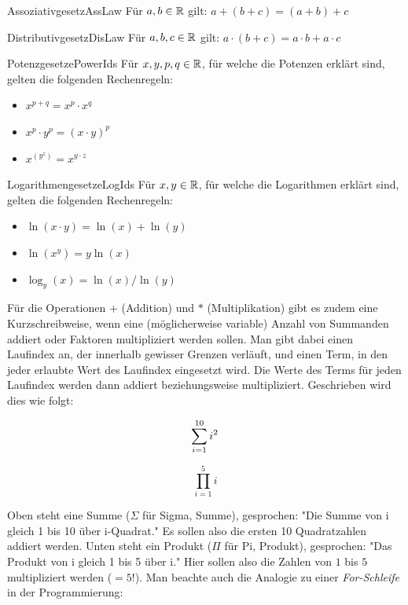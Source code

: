 \begin{statement}{Assoziativgesetz}{AssLaw}
	Für $a,b\in\mathbb{R}$ gilt: $a + ( b + c) = (a + b) + c$
\end{statement}

\begin{statement}{Distributivgesetz}{DisLaw}
	Für $a,b,c\in\mathbb{R}$ gilt: $a \cdot ( b + c ) = a \cdot b + a \cdot c$
\end{statement}

\begin{statement}{Potenzgesetze}{PowerIds}
	Für $x, y, p,q\in\mathbb{R}$, für welche die Potenzen erklärt sind, gelten die folgenden Rechenregeln:
	\begin{itemize}
		\item $x^{p+q} = x^p \cdot x^q$
		\item $x^p \cdot y^p = (x \cdot y)^p$
		\item $x^{(y^z)} = x^{y \cdot z}$
	\end{itemize}
\end{statement}

\begin{statement}{Logarithmengesetze}{LogIds}
	Für $x, y\in\mathbb{R}$, für welche die Logarithmen erklärt sind, gelten die folgenden Rechenregeln:
	\begin{itemize}
		\item $\ln(x \cdot y) = \ln(x) + \ln(y)$
		\item $\ln(x^y) = y \ln(x)$
		\item $\log_y(x) = \ln(x) / \ln(y)$
	\end{itemize}
\end{statement}

Für die Operationen $+$ (Addition) und $*$ (Multiplikation) gibt es zudem eine Kurzschreibweise, wenn eine (möglicherweise variable) Anzahl von Summanden addiert oder Faktoren multipliziert werden sollen. Man gibt dabei einen Laufindex an, der innerhalb gewisser Grenzen verläuft, und einen Term, in den jeder erlaubte Wert des Laufindex eingesetzt wird. Die Werte des Terms für jeden Laufindex werden dann addiert beziehungsweise multipliziert. Geschrieben wird dies wie folgt:

$$
\sum\limits_{i=1}^{10} i^2  \\
$$

$$
\prod\limits_{i=1}^{5} i
$$

Oben steht eine Summe ($\Sigma$ für Sigma, Summe), gesprochen: "Die Summe von i gleich 1 bis 10 über i-Quadrat." Es sollen also die ersten 10 Quadratzahlen addiert werden. Unten steht ein Produkt ($\Pi$ für Pi, Produkt), gesprochen: "Das Produkt von i gleich 1 bis 5 über i." Hier sollen also die Zahlen von $1$ bis $5$ multipliziert werden ($=5!$). Man beachte auch die Analogie zu einer \emph{For-Schleife} in der Programmierung:


